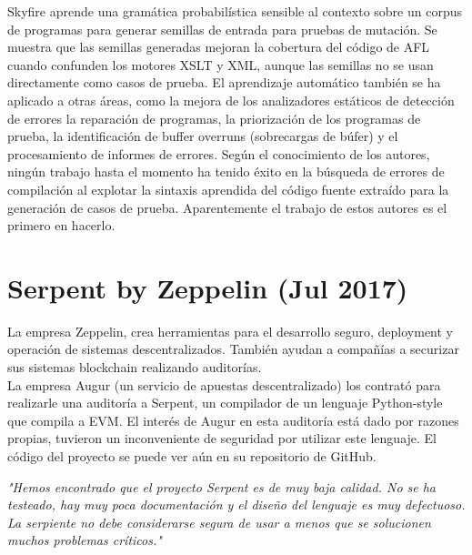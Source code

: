 Skyfire\cite{Wang:Chen:Wei:Liu:Skyfire} aprende una gramática probabilística sensible al contexto sobre un corpus de programas para generar semillas de entrada para pruebas de mutación. Se muestra que las semillas generadas mejoran la cobertura del código de AFL\cite{AFL} cuando confunden los motores XSLT y XML, aunque las semillas no se usan directamente como casos de prueba. El aprendizaje automático también se ha aplicado a otras áreas, como la mejora de los analizadores estáticos de detección de errores \cite{Heo:Oh:Yi:Unsound}\cite{Koc:Saadatpanah:Jeffrey:Porter:False} la reparación de programas\cite{Koukoutos:Raghothaman:Kneuss:Kuncak}\cite{White:Tufano:Martinez:Monperrus}, la priorización de los programas de prueba\cite{Chen:Bai:Hao:Xiong:Zhang}, la identificación de buffer overruns (sobrecargas de búfer)\cite{Choi:Jeong:Oh:Choo:BufferOverruns} y el procesamiento de informes de errores\cite{Xuan:Ming:Buggy}\cite{Lam:Anh:Nguyen:Nguyen:DeepLearning}. Según el conocimiento de los autores, ningún trabajo hasta el momento ha tenido éxito en la búsqueda de errores de compilación al explotar la sintaxis aprendida del código fuente extraído para la generación de casos de prueba. Aparentemente el trabajo de estos autores es el primero en hacerlo.

\section{Serpent by Zeppelin (Jul 2017)}

La empresa Zeppelin, crea herramientas para el desarrollo seguro, deployment y operación de sistemas descentralizados. También ayudan a compañías a securizar sus sistemas blockchain realizando auditorías.\\

La empresa Augur (un servicio de apuestas descentralizado) los contrató para realizarle una auditoría a Serpent, un compilador de un lenguaje Python-style que compila a EVM. El interés de Augur en esta auditoría está dado por razones propias, tuvieron un inconveniente de seguridad por utilizar este lenguaje. El código del proyecto se puede ver aún en su repositorio de GitHub\cite{SerpentRepository}.\\

\begin{displayquote}
    \textit{"Hemos encontrado que el proyecto Serpent es de muy baja calidad. No se ha testeado, hay muy poca documentación y el diseño del lenguaje es muy defectuoso. La serpiente no debe considerarse segura de usar a menos que se solucionen muchos problemas críticos."}
\end{displayquote}

